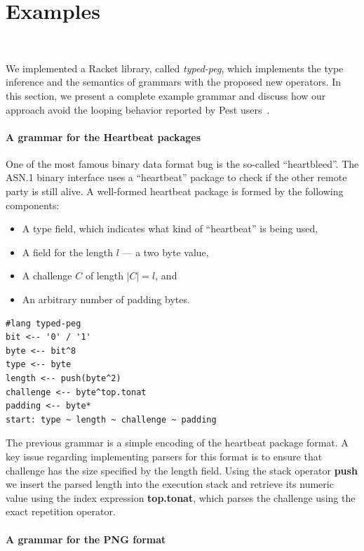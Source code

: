 \documentclass[preprint,12pt]{elsarticle}
\theoremstyle{definition}
\begin{document}
\section{Examples}~\label{sec:examples}

We implemented a Racket library, called \emph{typed-peg},
which implements the type inference and the semantics of grammars with the proposed new
operators. In this section, we present a complete example grammar and discuss how
our approach avoid the looping behavior reported by Pest users~\cite{PESTBUG}.

\paragraph{A grammar for the Heartbeat packages} One of the most famous binary data format
bug is the so-called ``heartbleed''. The ASN.1 binary interface uses a ``heartbeat''
package to check if the other remote party is still alive. A well-formed heartbeat package
is formed by the following components:
\begin{itemize}
  \item A type field, which indicates what kind of ``heartbeat'' is being used,
  \item A field for the length $l$ --- a two byte value,
  \item A challenge $C$ of length $|C| = l$, and
  \item An arbitrary number of padding bytes.
\end{itemize}

\begin{verbatim}
#lang typed-peg
bit <-- '0' / '1'
byte <-- bit^8
type <-- byte
length <-- push(byte^2)
challenge <-- byte^top.tonat
padding <-- byte*
start: type ~ length ~ challenge ~ padding
\end{verbatim}
The previous grammar is a simple encoding of the heartbeat package format.
A key issue regarding implementing parsers for this format is to ensure that
challenge has the size specified by the length field. Using the stack operator
\textbf{push} we insert the parsed length into the execution stack and retrieve
its numeric value using the index expression \textbf{top.tonat}, which parses
the challenge using the exact repetition operator.

\paragraph{A grammar for the PNG format}
\end{document}
